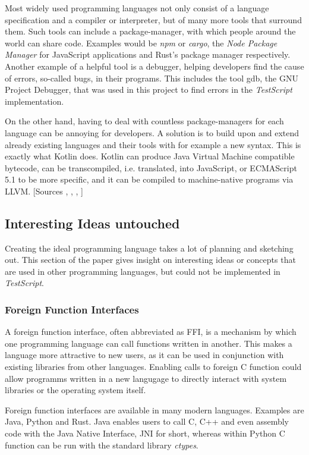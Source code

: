 \documentclass[12pt,a4paper]{article}
\newcommand{\name}{\emph{TestScript}}
\begin{document}
Most widely used programming languages not only consist
of a language specification and a compiler or interpreter, but of many more
tools that surround them.
Such tools can include a package-manager, with which people around the world
can share code. Examples would be \emph{npm} or \emph{cargo}, 
the \emph{Node Package Manager} for JavaScript applications and Rust's package 
manager respectively.
Another example of a helpful tool is a debugger, helping developers
find the cause of errors, so-called bugs, in their programs.
This includes the tool gdb, the GNU Project Debugger, that was used in this
project to find errors in the \name{} implementation.

On the other hand, having to deal with countless package-managers for each
language can be annoying for developers. A solution is to build upon and
extend already existing languages and their tools with for example a new syntax.
This is exactly what Kotlin does. Kotlin can produce Java Virtual Machine
compatible bytecode, can be transcompiled, i.e. translated, into
JavaScript, or ECMAScript 5.1 to be more specific,
and it can be compiled to machine-native programs via LLVM. 
[Sources , , , ]

\subsection{Interesting Ideas untouched}
Creating the ideal programming language takes a lot of planning and sketching
out. This section of the paper gives insight on interesting ideas or concepts
that are used in other programming languages, but 
could not be implemented in \name{}.

\subsubsection{Foreign Function Interfaces}
A foreign function interface, often abbreviated as FFI,
is a mechanism by which one programming language can call functions written 
in another. This makes a language more attractive to new users, as it can be used
in conjunction with existing libraries from other languages. 
Enabling calls to foreign C function could allow programms written in a new langugage
to directly interact with system libraries or the operating system itself.

Foreign function interfaces are available in many modern languages.
Examples are Java, Python and Rust.
Java enables users to call C, C++ and even assembly code with the Java Native
Interface, JNI for short, whereas within Python C function can
be run with the standard library \emph{ctypes}.
\end{document}
